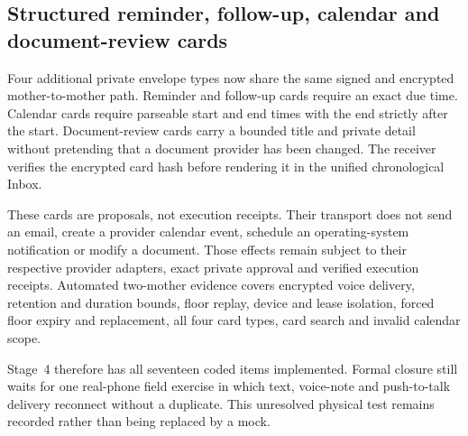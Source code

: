 \subsection{Structured reminder, follow-up, calendar and document-review cards}

Four additional private envelope types now share the same signed and encrypted mother-to-mother
path.  Reminder and follow-up cards require an exact due time.  Calendar cards require parseable
start and end times with the end strictly after the start.  Document-review cards carry a bounded
title and private detail without pretending that a document provider has been changed.  The
receiver verifies the encrypted card hash before rendering it in the unified chronological Inbox.

These cards are proposals, not execution receipts.  Their transport does not send an email,
create a provider calendar event, schedule an operating-system notification or modify a document.
Those effects remain subject to their respective provider adapters, exact private approval and
verified execution receipts.  Automated two-mother evidence covers encrypted voice delivery,
retention and duration bounds, floor replay, device and lease isolation, forced floor expiry and
replacement, all four card types, card search and invalid calendar scope.

Stage~4 therefore has all seventeen coded items implemented.  Formal closure still waits for one
real-phone field exercise in which text, voice-note and push-to-talk delivery reconnect without a
duplicate.  This unresolved physical test remains recorded rather than being replaced by a mock.
